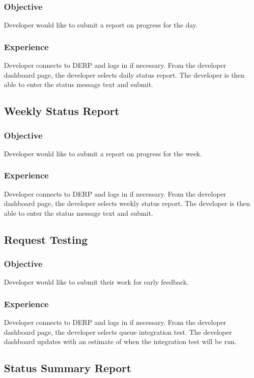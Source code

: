 \subsubsection*{Objective}
Developer would like to submit a report on progress for the day.
\subsubsection*{Experience}
Developer connects to DERP and logs in if necessary. From the developer dashboard page, the developer selects daily status report. The developer is then able to enter the status message text and submit.


\subsection*{Weekly Status Report}
\subsubsection*{Objective}
Developer would like to submit a report on progress for the week.
\subsubsection*{Experience}
Developer connects to DERP and logs in if necessary. From the developer dashboard page, the developer selects weekly status report. The developer is then able to enter the status message text and submit.


\subsection*{Request Testing}
\subsubsection*{Objective}
Developer would like to submit their work for early feedback.
\subsubsection*{Experience}
Developer connects to DERP and logs in if necessary. From the developer dashboard page, the developer selects queue integration test. The developer dashboard updates with an estimate of when the integration test will be run.


\subsection*{Status Summary Report}

